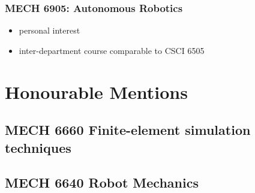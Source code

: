 \documentclass[11pt]{article}
\begin{document}
\subsubsection{MECH 6905: Autonomous Robotics}
\label{sec:org882a7ee}
\begin{itemize}
\item personal interest
\item inter-department course comparable to CSCI 6505
\end{itemize}

\section{Honourable Mentions}
\label{sec:orgb335139}

\subsection{MECH 6660   Finite-element simulation techniques}
\label{sec:orgf75076b}

\subsection{MECH 6640   Robot Mechanics}
\label{sec:orgf0b1991}
\end{document}
